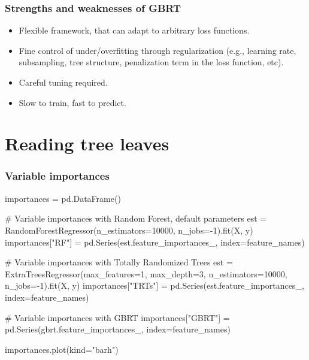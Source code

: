 \documentclass{beamer}
\begin{document}
\begin{frame}
  \frametitle{Strengths and weaknesses of GBRT}

  \begin{itemize}
        \item {\color{blue} Flexible framework}, that can adapt to arbitrary
              loss functions.

        \vspace{0.25cm}

        \item Fine control of under/overfitting through {\color{blue}
              regularization} (e.g., learning rate, subsampling,
              tree structure, penalization term in the loss function, etc).

        \vspace{0.25cm}

        \item {\color{red} Careful tuning} required.

        \vspace{0.25cm}

        \item {\color{red} Slow} to train, {\color{blue} fast} to predict.
  \end{itemize}
\end{frame}




\section{Reading tree leaves}

\begin{frame}[fragile]
  \frametitle{Variable importances}

{\scriptsize
\begin{pythoncode}
importances = pd.DataFrame()

# Variable importances with Random Forest, default parameters
est = RandomForestRegressor(n_estimators=10000, n_jobs=-1).fit(X, y)
importances["RF"] = pd.Series(est.feature_importances_,
                              index=feature_names)

# Variable importances with Totally Randomized Trees
est = ExtraTreesRegressor(max_features=1, max_depth=3,
                          n_estimators=10000, n_jobs=-1).fit(X, y)
importances["TRTs"] = pd.Series(est.feature_importances_,
                                index=feature_names)

# Variable importances with GBRT
importances["GBRT"] = pd.Series(gbrt.feature_importances_,
                                index=feature_names)

importances.plot(kind="barh")
\end{pythoncode}
}

\end{frame}
\end{document}
